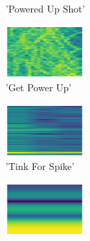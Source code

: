 \begin{figure}[H]
{\begin{subfigure}{0.23\textwidth}
{{        }\hspace*{0.75cm}%
      }%
      \caption*{'Powered Up Shot'}
    \end{subfigure}
    \begin{subfigure}{0.23\textwidth}
      \includegraphics[width=3cm]{sounds/buttons/13.wav-button.png}%
      \caption*{'Get Power Up'}
    \end{subfigure}
    \begin{subfigure}{0.23\textwidth}
      \includegraphics[width=3cm]{sounds/buttons/14.wav-button.png}%
      \caption*{'Tink For Spike'}
    \end{subfigure}
    \begin{subfigure}{0.23\textwidth}
      \includegraphics[width=3cm]{sounds/buttons/15.wav-button.png}%
\end{subfigure}}
\end{figure}

